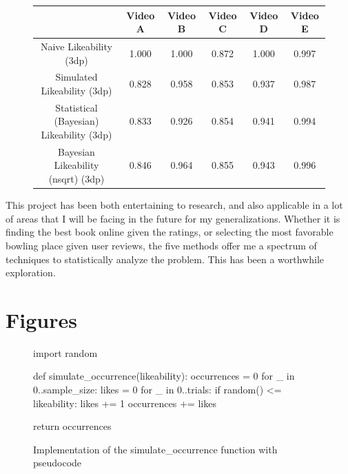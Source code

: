 \documentclass[a4paper,11pt]{article}
\begin{document}
\begin{figure}[H]
    \centering
    \begin{tabular}{c|c|c|c|c|c}
        & Video A & Video B & Video C & Video D & Video E \\
        \hline
        \hline
         Naive Likeability (3dp) & 1.000 & 1.000 & 0.872 & 1.000 & 0.997\\ \hline
         Simulated Likeability (3dp) & 0.828 & 0.958 &  0.853 & 0.937 & 0.987\\ \hline
         Statistical (Bayesian) Likeability (3dp) & 0.833 & 0.926 & 0.854 & 0.941 & 0.994\\ \hline
        Bayesian Likeability (nsqrt) (3dp) & 0.846 & 0.964 & 0.855 & 0.943 & 0.996
    \end{tabular}
    \label{tbl:all}
\end{figure}

This project has been both entertaining to research, and also applicable in a lot of areas that I will be facing in the future for my generalizations. Whether it is finding the best book online given the ratings, or selecting the most favorable bowling place given user reviews, the five methods offer me a spectrum of techniques to statistically analyze the problem. This has been a worthwhile exploration.

\newpage
\printbibliography


\newpage
\appendix
{}
\section{Figures}

\begin{figure}[H]
    \begin{pythonln}
import random

def simulate_occurrence(likeability):
    occurrences = 0
    for _ in 0..sample_size:
        likes = 0
        for _ in 0..trials:
            if random() <= likeability:
                likes += 1
            occurrences += likes

    return occurrences
    \end{pythonln}
    \caption{Implementation of the simulate\_occurrence function with pseudocode}
    \label{apd:sim_occ}
\end{figure}
\end{document}

